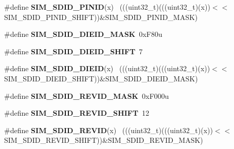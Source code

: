 \begin{DoxyCompactItemize}
\item 
\hypertarget{group___s_i_m___register___masks_ga3ab62e28831b168141d554c707ac5c87}{}\#define {\bfseries S\+I\+M\+\_\+\+S\+D\+I\+D\+\_\+\+P\+I\+N\+I\+D}(x)                                            ~(((uint32\+\_\+t)(((uint32\+\_\+t)(x))$<$$<$S\+I\+M\+\_\+\+S\+D\+I\+D\+\_\+\+P\+I\+N\+I\+D\+\_\+\+S\+H\+I\+F\+T))\&S\+I\+M\+\_\+\+S\+D\+I\+D\+\_\+\+P\+I\+N\+I\+D\+\_\+\+M\+A\+S\+K)\label{group___s_i_m___register___masks_ga3ab62e28831b168141d554c707ac5c87}

\item 
\hypertarget{group___s_i_m___register___masks_ga8b02a91f9dd18064e4fc83575cfb117e}{}\#define {\bfseries S\+I\+M\+\_\+\+S\+D\+I\+D\+\_\+\+D\+I\+E\+I\+D\+\_\+\+M\+A\+S\+K}~0x\+F80u\label{group___s_i_m___register___masks_ga8b02a91f9dd18064e4fc83575cfb117e}

\item 
\hypertarget{group___s_i_m___register___masks_gaedeb2d58c67fcc1e588f224527ac623b}{}\#define {\bfseries S\+I\+M\+\_\+\+S\+D\+I\+D\+\_\+\+D\+I\+E\+I\+D\+\_\+\+S\+H\+I\+F\+T}~7\label{group___s_i_m___register___masks_gaedeb2d58c67fcc1e588f224527ac623b}

\item 
\hypertarget{group___s_i_m___register___masks_ga85856fcb2923b955441af9d98ab4b04d}{}\#define {\bfseries S\+I\+M\+\_\+\+S\+D\+I\+D\+\_\+\+D\+I\+E\+I\+D}(x)                                            ~(((uint32\+\_\+t)(((uint32\+\_\+t)(x))$<$$<$S\+I\+M\+\_\+\+S\+D\+I\+D\+\_\+\+D\+I\+E\+I\+D\+\_\+\+S\+H\+I\+F\+T))\&S\+I\+M\+\_\+\+S\+D\+I\+D\+\_\+\+D\+I\+E\+I\+D\+\_\+\+M\+A\+S\+K)\label{group___s_i_m___register___masks_ga85856fcb2923b955441af9d98ab4b04d}

\item 
\hypertarget{group___s_i_m___register___masks_gafefd91d0385c1b93049ec14409ed6b1e}{}\#define {\bfseries S\+I\+M\+\_\+\+S\+D\+I\+D\+\_\+\+R\+E\+V\+I\+D\+\_\+\+M\+A\+S\+K}~0x\+F000u\label{group___s_i_m___register___masks_gafefd91d0385c1b93049ec14409ed6b1e}

\item 
\hypertarget{group___s_i_m___register___masks_gadb535428e0ca83d2494493ed04822b8c}{}\#define {\bfseries S\+I\+M\+\_\+\+S\+D\+I\+D\+\_\+\+R\+E\+V\+I\+D\+\_\+\+S\+H\+I\+F\+T}~12\label{group___s_i_m___register___masks_gadb535428e0ca83d2494493ed04822b8c}

\item 
\hypertarget{group___s_i_m___register___masks_ga892bb65b3dc043087208ead1ea269b95}{}\#define {\bfseries S\+I\+M\+\_\+\+S\+D\+I\+D\+\_\+\+R\+E\+V\+I\+D}(x)                                            ~(((uint32\+\_\+t)(((uint32\+\_\+t)(x))$<$$<$S\+I\+M\+\_\+\+S\+D\+I\+D\+\_\+\+R\+E\+V\+I\+D\+\_\+\+S\+H\+I\+F\+T))\&S\+I\+M\+\_\+\+S\+D\+I\+D\+\_\+\+R\+E\+V\+I\+D\+\_\+\+M\+A\+S\+K)\label{group___s_i_m___register___masks_ga892bb65b3dc043087208ead1ea269b95}


\end{DoxyCompactItemize}
